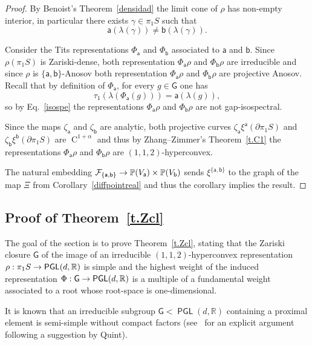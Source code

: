 \documentclass[AHL,Unicode,longabstracts,MathTools]{cedram}
\DeclareMathOperator{\class}{C}
\DeclareMathOperator{\PGL}{{\mathsf{PGL}}}
\renewcommand{\sf}[1]{{\mathsf{#1}}}
\newcommand{\sroot}{{\sf{a}}}
\newcommand{\bb}{{\sf{b}}}
\newcommand{\sfG}{\sf{G}}
\newcommand{\calF}{\mathcal{F}}
\newcommand{\R}{\mathbb{R}}
\renewcommand{\P}{\mathbb{P}}
\newcommand{\g}{\gamma}
\newcommand{\bord}{\partial}
\newcommand{\piS}{\pi_1S}
\newcommand{\Fund}{\Phi}
\newcommand{\slroot}{{\tau}}
\renewcommand{\/}{\backslash}
\newcommand{\<}{\langle}
\renewcommand{\>}{\rangle}
\renewcommand*{\to}{\mathchoice{\longrightarrow}{\rightarrow}{\rightarrow}{\rightarrow}}
\begin{document}
\begin{proof}
By Benoist's Theorem~\ref{densidad} the limit cone of $\rho$ has non-empty interior, in particular there exists $\g\in\piS$ such that
\begin{equation}\label{isospe}
\sroot(\lambda(\g))\neq\bb(\lambda(\g)).
\end{equation}

Consider the Tits representations $\Fund_\sroot$ and $\Fund_\bb$ associated to $\sroot$ and $\bb$. Since $\rho(\piS)$ is Zariski-dense, both representation $\Fund_\sroot\rho$ and $\Fund_\bb\rho$ are irreducible and since $\rho$ is $\{\sroot, \bb\}$-Anosov both representation $\Fund_\sroot\rho$ and $\Fund_\bb\rho$ are projective Anosov. Recall that by definition of $\Fund_\sroot$, for every $g\in\sfG$ one has
\[
\slroot_1(\lambda(\Fund_\sroot(g)))=\sroot(\lambda(g)),
\]
so by Eq.~\eqref{isospe} the representations $\Fund_\sroot\rho$ and $\Fund_\bb\rho$ are not gap-isospectral.

Since the maps $\zeta_\sroot$ and $\zeta_\bb$ are analytic, both projective curves $\zeta_\sroot\xi^{\sroot}(\bord\piS)$ and $\zeta_\bb\xi^{\bb}(\bord\piS)$ are $\class^{1+\alpha}$ and thus by Zhang--Zimmer's Theorem~\ref{t.C1} the representations $\Fund_\sroot\rho$ and $\Fund_\bb\rho$ are $(1,1,2)$-hyperconvex.

The natural embedding $\calF_{\{\sroot,\bb\}}\to\P(V_\sroot)\times\P(V_\bb)$ sends $\xi^{\{\sroot,\bb\}}$ to the graph of the map $\Xi$ from Corollary~\ref{diffpointreal} and thus the corollary implies the result.
\end{proof}



\subsection{Proof of Theorem~\ref{t.Zcl}}\label{s.pB}
\label{s.Zd}
The goal of the section is to prove Theorem~\ref{t.Zcl}, stating that the Zariski closure $\sfG$ of the image of an irreducible $(1,1,2)$-hyperconvex representation $\rho:\piS\to\PGL(d,\R)$ is simple and the highest weight of the induced representation $\Fund:\sfG\to\PGL(d,\R)$ is a multiple of a fundamental weight associated to a root whose root-space is one-dimensional.


It is known that an irreducible subgroup $\sfG<\PGL(d,\R)$ containing a proximal element is semi-simple without compact factors (see~\cite[Lemma~8.6]{entropia} for an explicit argument following a suggestion by Quint).
\end{document}

